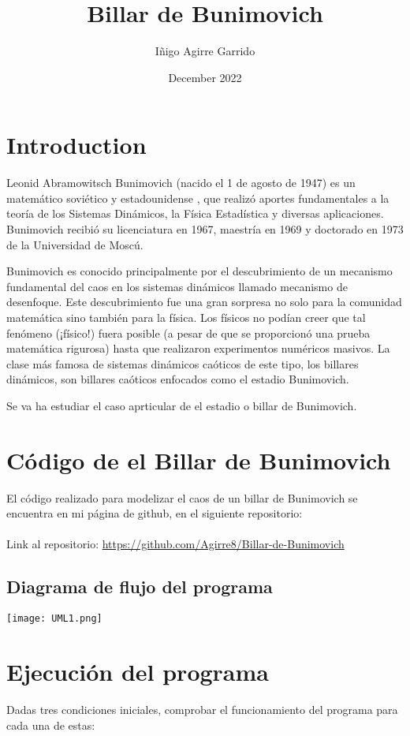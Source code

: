 \documentclass{article}
\title{Billar de Bunimovich}
\author{Iñigo Agirre Garrido}
\date{December 2022}
\begin{document}
\maketitle

\section{Introduction}
Leonid Abramowitsch Bunimovich (nacido el 1 de agosto de 1947) es un matemático soviético y estadounidense , que realizó aportes fundamentales a la teoría de los Sistemas Dinámicos, la Física Estadística y diversas aplicaciones. Bunimovich recibió su licenciatura en 1967, maestría en 1969 y doctorado en 1973 de la Universidad de Moscú.

Bunimovich es conocido principalmente por el descubrimiento de un mecanismo fundamental del caos en los sistemas dinámicos llamado mecanismo de desenfoque. Este descubrimiento fue una gran sorpresa no solo para la comunidad matemática sino también para la física. Los físicos no podían creer que tal fenómeno (¡físico!) fuera posible (a pesar de que se proporcionó una prueba matemática rigurosa) hasta que realizaron experimentos numéricos masivos. La clase más famosa de sistemas dinámicos caóticos de este tipo, los billares dinámicos, son billares caóticos enfocados como el estadio Bunimovich.

Se va ha estudiar el caso aprticular de el estadio o billar de Bunimovich.

\section{Código de el Billar de Bunimovich}

El código realizado para modelizar el caos de un billar de Bunimovich se encuentra en mi página de github, en el siguiente repositorio:\\
\\
Link al repositorio: \url{https://github.com/Agirre8/Billar-de-Bunimovich}

\subsection{Diagrama de flujo del programa}
\begin{center}
        \texttt{[image: UML1.png]}
\end{center}
\newpage

\section{Ejecución del programa}
Dadas tres condiciones iniciales, comprobar el funcionamiento del programa para cada una de estas:
\\
\end{document}
